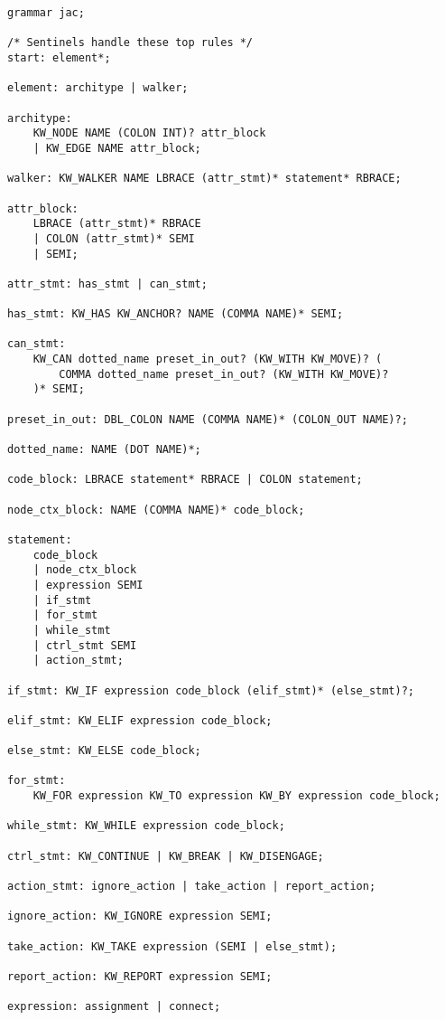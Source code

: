 \begin{lstlisting}[style=gram, numbers=none,
    captionpos=t, caption=Jac Language Grammar]
grammar jac;

/* Sentinels handle these top rules */
start: element*;

element: architype | walker;

architype:
    KW_NODE NAME (COLON INT)? attr_block
    | KW_EDGE NAME attr_block;

walker: KW_WALKER NAME LBRACE (attr_stmt)* statement* RBRACE;

attr_block:
    LBRACE (attr_stmt)* RBRACE
    | COLON (attr_stmt)* SEMI
    | SEMI;

attr_stmt: has_stmt | can_stmt;

has_stmt: KW_HAS KW_ANCHOR? NAME (COMMA NAME)* SEMI;

can_stmt:
    KW_CAN dotted_name preset_in_out? (KW_WITH KW_MOVE)? (
        COMMA dotted_name preset_in_out? (KW_WITH KW_MOVE)?
    )* SEMI;

preset_in_out: DBL_COLON NAME (COMMA NAME)* (COLON_OUT NAME)?;

dotted_name: NAME (DOT NAME)*;

code_block: LBRACE statement* RBRACE | COLON statement;

node_ctx_block: NAME (COMMA NAME)* code_block;

statement:
    code_block
    | node_ctx_block
    | expression SEMI
    | if_stmt
    | for_stmt
    | while_stmt
    | ctrl_stmt SEMI
    | action_stmt;

if_stmt: KW_IF expression code_block (elif_stmt)* (else_stmt)?;

elif_stmt: KW_ELIF expression code_block;

else_stmt: KW_ELSE code_block;

for_stmt:
    KW_FOR expression KW_TO expression KW_BY expression code_block;

while_stmt: KW_WHILE expression code_block;

ctrl_stmt: KW_CONTINUE | KW_BREAK | KW_DISENGAGE;

action_stmt: ignore_action | take_action | report_action;

ignore_action: KW_IGNORE expression SEMI;

take_action: KW_TAKE expression (SEMI | else_stmt);

report_action: KW_REPORT expression SEMI;

expression: assignment | connect;


\end{lstlisting}

